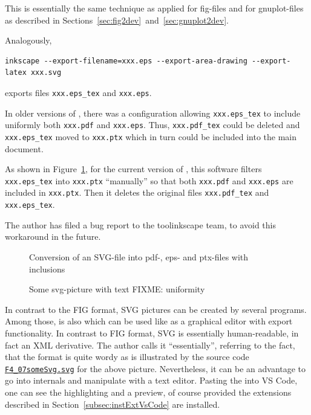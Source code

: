 This is essentially the same technique as applied for fig-files 
and for gnuplot-files as described 
in Sections~\ref{sec:fig2dev}~and~\ref{sec:gnuplot2dev}. 

Analogously,
%
\begin{Verbatim}[fontsize=\footnotesize]
inkscape --export-filename=xxx.eps --export-area-drawing --export-latex xxx.svg 
\end{Verbatim}
%
exports files \texttt{xxx.eps\_tex} and \texttt{xxx.eps}.

In older versions of ,
there was a configuration allowing \texttt{xxx.eps\_tex}
to include uniformly both \texttt{xxx.pdf} and \texttt{xxx.eps}.
Thus, \texttt{xxx.pdf\_tex} could be deleted
and \texttt{xxx.eps\_tex} moved to \texttt{xxx.ptx}
which in turn could be included into the main document.

As shown in Figure~\ref{fig:svg2pdf},
for the current version of ,
this software filters \texttt{xxx.eps\_tex} into \texttt{xxx.ptx}
``manually'' so that both \texttt{xxx.pdf} and \texttt{xxx.eps}
are included in \texttt{xxx.ptx}.
Then it deletes the original files
\texttt{xxx.pdf\_tex} and \texttt{xxx.eps\_tex}.

The author has filed a bug report to the tool{inkscape} team,
to avoid this workaround in the future. 

\begin{figure}[htb]
\centering
{}
\caption{\label{fig:svg2pdf}Conversion of an SVG-file 
into pdf-, eps- and ptx-files with inclusions}
\end{figure}


\begin{figure}[htb]
\centering
\caption{\label{fig:svgWithText}Some svg-picture with text FIXME\@: uniformity}
\end{figure}

In contrast to the FIG format, 
SVG pictures can be created by several programs. 
Among those, is also  
which can be used like   
as a graphical editor with export functionality. 
In contrast to FIG format, 
SVG is essentially human-readable, 
in fact an XML derivative. 
The author calls it ``essentially'', 
referring to the fact, that the format is quite wordy 
as is illustrated by the source code 
\href{\urlSite fromTex/F4_07someSvg.svg}{\texttt{F4\_07someSvg.svg}} 
for the above picture. 
Nevertheless, it can be an advantage 
to go into internals and manipulate with a text editor. 
Pasting the into VS Code, one can see the highlighting and a preview, 
of course provided the extensions 
described in Section~\ref{subsec:instExtVsCode} are installed. 



